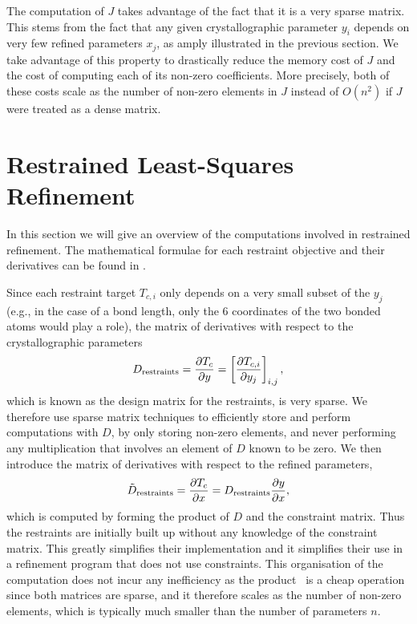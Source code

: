 \documentclass[pdf]{iucr}
\newcommand{\partialder}[2]{\frac{\partial #1}{\partial #2}}
\begin{document}
The computation of $J$ takes advantage of the fact that it is a very sparse matrix. This stems from the fact that any given crystallographic parameter $y_i$ depends on very few refined parameters $x_j$, as amply illustrated in the previous section. We take advantage of this property to drastically reduce the memory cost of $J$ and the cost of computing each of its non-zero coefficients. More precisely, both of these costs scale as the number of non-zero elements in $J$ instead of $O(n^2)$ if $J$ were treated as a dense matrix.

\section{Restrained Least-Squares Refinement}
\label{sec:restraints}

In this section we will give an overview of the computations involved in restrained refinement. The mathematical formulae for each restraint objective and their derivatives can be found in .

Since each restraint target $T_{c,i}$ only depends on a very small subset of the $y_j$ (e.g., in the case of a bond length, only the 6 coordinates of the two bonded atoms would play a role), the matrix of derivatives with respect to the crystallographic parameters
\begin{equation}
D_\restraints = \partialder{T_c}{y} = \left[\partialder{T_{c,i}}{y_j}\right]_{i,j},
\end{equation}
which is known as the design matrix for the restraints, is very sparse. We therefore use sparse matrix techniques to efficiently store and perform computations with $D$, by only storing non-zero elements, and never performing any multiplication that involves an element of $D$ known to be zero. We then introduce the matrix of derivatives with respect to the refined parameters,
\begin{equation}
\tilde{D}_\restraints = \partialder{T_c}{x} = D_\restraints \partialder{y}{x},
\label{eqn:constraints:applied:torestraints}
\end{equation}
which is computed by forming the product of $D$ and the constraint matrix. Thus the restraints are initially built up without any knowledge of the constraint matrix. This greatly simplifies their implementation and it simplifies their use in a refinement program that does not use constraints. This organisation of the computation does not incur any inefficiency as the product~ is a cheap operation since both matrices are sparse, and it therefore scales as the number of non-zero elements, which is typically much smaller than the number of parameters $n$. 
\end{document}
